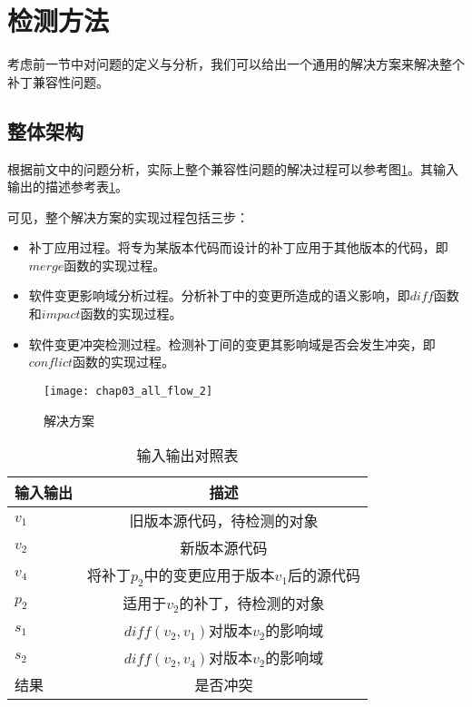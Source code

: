 \section{检测方法}
\label {problem_solve}

考虑前一节中对问题的定义与分析，我们可以给出一个通用的解决方案来解决整个补丁兼容性问题。

\subsection{整体架构}
\label {problem_all}

根据前文中的问题分析，实际上整个兼容性问题的解决过程可以参考图\ref {all_flow}。其输入输出的描述参考表\ref {all_io}。

可见，整个解决方案的实现过程包括三步：
\begin{itemize}
	\item 补丁应用过程。将专为某版本代码而设计的补丁应用于其他版本的代码，即$merge$函数的实现过程。
	\item 软件变更影响域分析过程。分析补丁中的变更所造成的语义影响，即$diff$函数和$impact$函数的实现过程。
	\item 软件变更冲突检测过程。检测补丁间的变更其影响域是否会发生冲突，即$conflict$函数的实现过程。
\end{itemize}

\begin{figure}[H]
	\centering
	\texttt{[image: chap03\_all\_flow\_2]}
	\caption {解决方案}
	\label {all_flow}	
\end{figure}

\begin{table}[H]
	\caption{输入输出对照表}
	\label{all_io}
	\centering
	\begin{tabular}{lc}
		\toprule[1.5pt]
		{\heiti 输入输出} & {\heiti 描述}\\\midrule[1pt]
		$v_1$ & 旧版本源代码，待检测的对象 \\
		$v_2$ & 新版本源代码 \\
		$v_4$ & 将补丁$p_2$中的变更应用于版本$v_1$后的源代码 \\
		$p_2$ & 适用于$v_2$的补丁，待检测的对象 \\
		$s_1$ & $diff(v_2,v_1)$对版本$v_2$的影响域 \\
		$s_2$ & $diff(v_2,v_4)$对版本$v_2$的影响域 \\
		结果 & 是否冲突 \\
		\bottomrule[1.5pt]
	\end{tabular}
\end{table}

